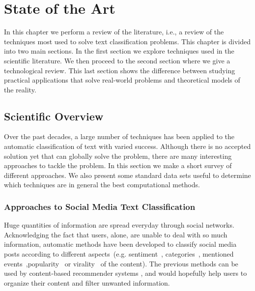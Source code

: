 \chapter{State of the Art} %

\label{art} %

In this chapter we perform a review of the literature, i.e., a review of the techniques most used to solve text classification problems. This chapter is divided into two main sections. In the first section we explore techniques used in the scientific literature. We then proceed to the second section where we give a technological review. This last section shows the difference between studying practical applications that solve real-world problems and theoretical models of the reality.


\section{Scientific Overview}

Over the past decades, a large number of techniques has been applied to the automatic classification of text with varied success. Although there is no accepted solution yet that can globally solve the problem, there are many interesting approaches to tackle the problem. In this section we make a short survey of different approaches. We also present some standard data sets useful to determine which techniques are in general the best computational methods. 


\subsection{Approaches to Social Media Text Classification}

Huge quantities of information are spread everyday through social networks.
Acknowledging the fact that users, alone, are unable to deal with so much information, automatic methods have been developed to classify social media posts according to different aspects~(e.g. sentiment~\citep{Preslav2013SemEval}, categories~\citep{Bharath2010TwitterFiltering}, mentioned events~\citep{Ritter2012OpenDomain},popularity~\citep{Bharath2010TwitterFiltering,Fernandes2015PredictingPopularity} or virality~\citep{guerinietal2011TextVirality} of the content).
The previous methods can be used by content-based recommender systems \citep{lops2011recommendersystems}, and would hopefully help users to organize their content and filter unwanted information.

